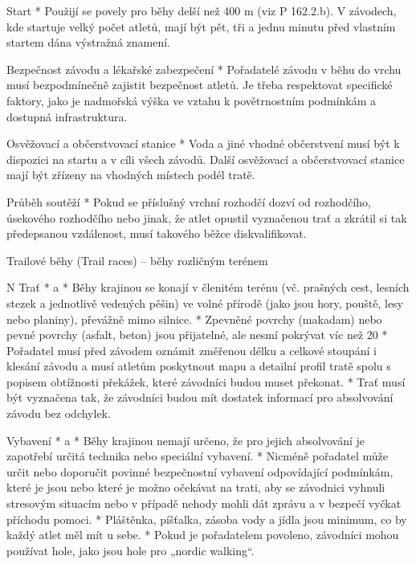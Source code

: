 Start
* Použijí se povely pro běhy delší než 400 m (viz P 162.2.b). V závodech, kde startuje velký počet atletů, mají být pět, tři a jednu minutu před vlastním startem dána výstražná znamení.

Bezpečnost závodu a lékařské zabezpečení
* Pořadatelé závodu v běhu do vrchu musí bezpodmínečně zajistit bezpečnost atletů. Je třeba respektovat specifické faktory, jako je nadmořská výška ve vztahu k povětrnostním podmínkám a dostupná infrastruktura.

Osvěžovací a občerstvovací stanice
* Voda a jiné vhodné občerstvení musí být k dispozici na startu a v cíli všech závodů. Další osvěžovací a občerstvovací stanice mají být zřízeny na vhodných místech podél tratě.

Průběh soutěží
* Pokud se příslušný vrchní rozhodčí dozví od rozhodčího, úsekového rozhodčího nebo jinak, že atlet opustil vyznačenou trať a zkrátil si tak předepsanou vzdálenost, musí takového běžce diskvalifikovat.
\enditems

\secc Trailové běhy (Trail races) – běhy rozličným terénem

\begitems \style N
Trať
* \begitems \style a
  * Běhy krajinou se konají v členitém terénu (vč. prašných cest, lesních stezek a jednotlivě vedených pěšin) ve volné přírodě (jako jsou hory, pouště, lesy nebo planiny), převážně mimo silnice.
  * Zpevněné povrchy (makadam) nebo pevné povrchy (asfalt, beton) jsou přijatelné, ale nesmí pokrývat víc než 20 %
  * Pořadatel musí před závodem oznámit změřenou délku a celkové stoupání i klesání závodu a musí atletům poskytnout mapu a detailní profil tratě spolu s popisem obtížnosti překážek, které závodníci budou muset překonat.
  * Trať musí být vyznačena tak, že závodníci budou mít dostatek informací pro absolvování závodu bez odchylek.
  \enditems

Vybavení
* \begitems \style a
  * Běhy krajinou nemají určeno, že pro jejich absolvování je zapotřebí určitá technika nebo speciální vybavení.
  * Nicméně pořadatel může určit nebo doporučit povinné bezpečnostní vybavení odpovídající podmínkám, které je jsou nebo které je možno očekávat na trati, aby se závodnici vyhnuli stresovým situacím nebo v případě nehody mohli dát zprávu a v bezpečí vyčkat příchodu pomoci.
  * Pláštěnka, píšťalka, zásoba vody a jídla jsou minimum, co by každý atlet měl mít u sebe.
  * Pokud je pořadatelem povoleno, závodníci mohou používat hole, jako jsou hole pro „nordic walking“.
  \enditems

